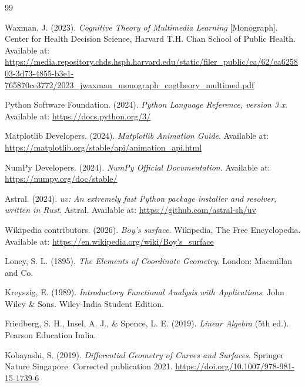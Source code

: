 \documentclass[12pt, a4paper]{report}
\begin{document}
\begin{thebibliography}{99}

Waxman, J. (2023). \textit{Cognitive Theory of Multimedia Learning} [Monograph]. Center for Health Decision Science, Harvard T.H. Chan School of Public Health. Available at: \url{https://media.repository.chds.hsph.harvard.edu/static/filer_public/ca/62/ca625803-3d73-4855-b3e1-765870ce3772/2023_jwaxman_monograph_cogtheory_multimed.pdf}

Python Software Foundation. (2024). \textit{Python Language Reference, version 3.x}. Available at: \url{https://docs.python.org/3/}

Matplotlib Developers. (2024). \textit{Matplotlib Animation Guide}. Available at: \url{https://matplotlib.org/stable/api/animation_api.html}

NumPy Developers. (2024). \textit{NumPy Official Documentation}. Available at: \url{https://numpy.org/doc/stable/}

Astral. (2024). \textit{uv: An extremely fast Python package installer and resolver, written in Rust}. Astral. Available at: \url{https://github.com/astral-sh/uv}

Wikipedia contributors. (2026). \textit{Boy's surface}. Wikipedia, The Free Encyclopedia. Available at: \url{https://en.wikipedia.org/wiki/Boy's_surface}

Loney, S. L. (1895). \textit{The Elements of Coordinate Geometry}. London: Macmillan and Co.

Kreyszig, E. (1989). \textit{Introductory Functional Analysis with Applications}. John Wiley \& Sons. Wiley-India Student Edition.

Friedberg, S. H., Insel, A. J., \& Spence, L. E. (2019). \textit{Linear Algebra} (5th ed.). Pearson Education India.

Kobayashi, S. (2019). \textit{Differential Geometry of Curves and Surfaces}. Springer Nature Singapore. Corrected publication 2021. \url{https://doi.org/10.1007/978-981-15-1739-6}

\end{thebibliography}



\clearpage

\appendix
\end{document}
